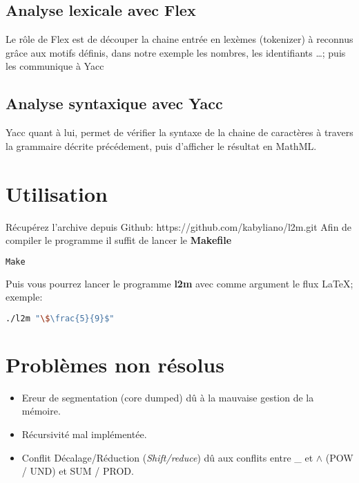 \documentclass[12pt,a4paper]{article}
\begin{document}
\subsection{Analyse lexicale avec Flex}

Le rôle de Flex est de découper la chaine entrée en lexèmes (tokenizer) à reconnus grâce aux  motifs définis, dans notre exemple les nombres, les identifiants \ldots ; puis les communique à Yacc


\subsection{Analyse syntaxique avec Yacc}
Yacc quant à lui,  permet de vérifier la syntaxe de la chaine de caractères à travers la grammaire décrite précédement, puis d'afficher le résultat en MathML.


\section{Utilisation}

Récupérez l'archive depuis Github: https://github.com/kabyliano/l2m.git
Afin de compiler le programme il suffit de lancer le \textbf{Makefile}

\begin{lstlisting}[language=Bash]
Make
\end{lstlisting}
Puis vous pourrez lancer le programme \textbf{l2m} avec comme argument le flux \LaTeX; exemple:

\begin{lstlisting}[language=Bash]
./l2m "\$\frac{5}{9}$"
\end{lstlisting}

\section{Problèmes non résolus}
\begin{itemize}
	\item Ereur de segmentation (core dumped) dû à la mauvaise gestion de la mémoire.
	\item Récursivité mal implémentée.
	\item Conflit Décalage/Réduction (\textit{Shift/reduce}) dû aux conflits entre \_ et $\wedge$ (POW / UND) et SUM / PROD.
\end{itemize}

	
\end{document}
